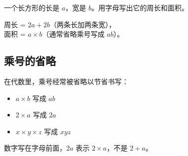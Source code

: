 \begin{example}
一个长方形的长是 $a$，宽是 $b$。用字母写出它的周长和面积。
\end{example}
\begin{solution}
周长 = $2a+2b$（两条长加两条宽），\\
面积 = $a\times b$（通常省略乘号写成 $ab$）。
\end{solution}

\subsection*{乘号的省略}

在代数里，乘号经常被省略以节省书写：
\begin{itemize}
  \item $a\times b$ 写成 $ab$
  \item $2\times a$ 写成 $2a$
  \item $x\times y\times z$ 写成 $xyz$
\end{itemize}
数字写在字母前面，$2a$ 表示 $2\times a$，不是 $2+a$。


